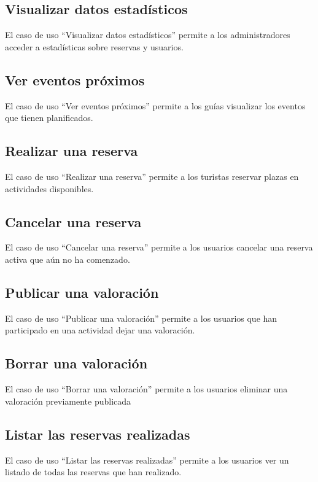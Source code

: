 \subsection{Visualizar datos estadísticos}
El caso de uso “Visualizar datos estadísticos” permite a los administradores acceder a estadísticas sobre reservas y usuarios.

\subsection{Ver eventos próximos}
El caso de uso “Ver eventos próximos” permite a los guías visualizar los eventos que tienen planificados.

\subsection{Realizar una reserva}
El caso de uso “Realizar una reserva” permite a los turistas reservar plazas en actividades disponibles.

\subsection{Cancelar una reserva}
El caso de uso “Cancelar una reserva” permite a los usuarios cancelar una reserva activa que aún no ha comenzado.

\subsection{Publicar una valoración}
El caso de uso “Publicar una valoración” permite a los usuarios que han participado en una actividad dejar una valoración.

\subsection{Borrar una valoración}
El caso de uso “Borrar una valoración” permite a los usuarios eliminar una valoración previamente publicada

\subsection{Listar las reservas realizadas}
El caso de uso “Listar las reservas realizadas” permite a los usuarios ver un listado de todas las reservas que han realizado.

